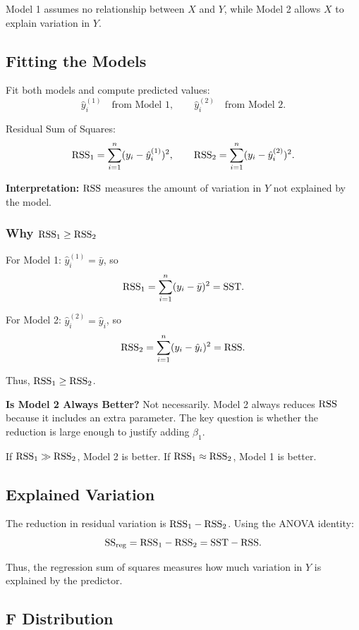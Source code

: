 Model 1 assumes no relationship between $X$ and $Y$, while Model 2 allows $X$ to explain variation in $Y$.

\subsection{Fitting the Models}

Fit both models and compute predicted values:
\[
\hat{y}_i^{(1)} \quad \text{from Model 1},
\qquad
\hat{y}_i^{(2)} \quad \text{from Model 2}.
\]

Residual Sum of Squares:
\[
\mathrm{RSS}_1=\sum_{i=1}^{n}(y_i-\hat{y}_i^{(1)})^2,
\qquad
\mathrm{RSS}_2=\sum_{i=1}^{n}(y_i-\hat{y}_i^{(2)})^2.
\]

\textbf{Interpretation:} $\mathrm{RSS}$ measures the amount of variation in $Y$ not explained by the model.

\subsubsection{Why $\mathrm{RSS}_1 \ge \mathrm{RSS}_2$}

For Model 1: $\hat{y}_i^{(1)}=\bar{y}$, so
\[
\mathrm{RSS}_1=\sum_{i=1}^{n}(y_i-\bar{y})^2=\mathrm{SST}.
\]

For Model 2: $\hat{y}_i^{(2)}=\hat{y}_i$, so
\[
\mathrm{RSS}_2=\sum_{i=1}^{n}(y_i-\hat{y}_i)^2=\mathrm{RSS}.
\]

Thus, $\mathrm{RSS}_1 \ge \mathrm{RSS}_2$.

\begin{caution}
\textbf{Is Model 2 Always Better?} Not necessarily. Model 2 always reduces $\mathrm{RSS}$ because it includes an extra parameter. The key question is whether the reduction is large enough to justify adding $\beta_1$.

If $\mathrm{RSS}_1 \gg \mathrm{RSS}_2$, Model 2 is better.
If $\mathrm{RSS}_1 \approx \mathrm{RSS}_2$, Model 1 is better.
\end{caution}

\subsection{Explained Variation}

The reduction in residual variation is $\mathrm{RSS}_1-\mathrm{RSS}_2$. Using the ANOVA identity:
\[
\mathrm{SS}_{\mathrm{reg}}=\mathrm{RSS}_1-\mathrm{RSS}_2=\mathrm{SST}-\mathrm{RSS}.
\]

Thus, the regression sum of squares measures how much variation in $Y$ is explained by the predictor.

\subsection{F Distribution}

